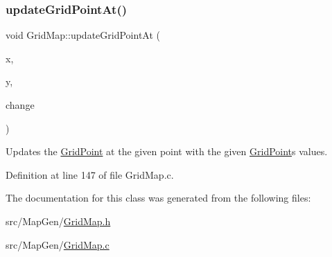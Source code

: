 \mbox{\label{class_world_architect_1_1_grid_map_a67735350af692d4e42fe83e21c0cbe04}} 
\subsubsection{\texorpdfstring{updateGridPointAt()}{updateGridPointAt()}}
{\footnotesize\ttfamily void Grid\+Map\+::update\+Grid\+Point\+At (\begin{DoxyParamCaption}\item[{int}]{x,  }\item[{int}]{y,  }\item[{\mbox{\hyperlink{struct_world_architect_1_1_grid_point}{Grid\+Point}} $\ast$}]{change }\end{DoxyParamCaption})}



Updates the \mbox{\hyperlink{struct_world_architect_1_1_grid_point}{Grid\+Point}} at the given point with the given \mbox{\hyperlink{struct_world_architect_1_1_grid_point}{Grid\+Point}}\textquotesingle{}s values. 



Definition at line 147 of file Grid\+Map.\+c.



The documentation for this class was generated from the following files\+:\begin{DoxyCompactItemize}
\item 
src/\+Map\+Gen/\mbox{\hyperlink{_grid_map_8h}{Grid\+Map.\+h}}\item 
src/\+Map\+Gen/\mbox{\hyperlink{_grid_map_8c}{Grid\+Map.\+c}}\end{DoxyCompactItemize}
